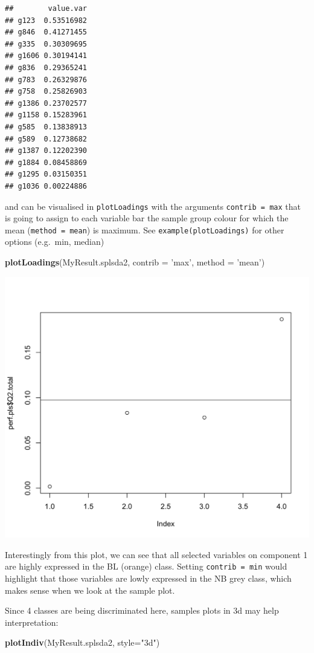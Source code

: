 \documentclass[]{book}
\newenvironment{Shaded}{\begin{snugshade}}{\end{snugshade}}
\newcommand{\KeywordTok}[1]{\textcolor[rgb]{0.13,0.29,0.53}{\textbf{#1}}}
\newcommand{\DataTypeTok}[1]{\textcolor[rgb]{0.13,0.29,0.53}{#1}}
\newcommand{\StringTok}[1]{\textcolor[rgb]{0.31,0.60,0.02}{#1}}
\newcommand{\NormalTok}[1]{#1}
\theoremstyle{definition}
\theoremstyle{definition}
\theoremstyle{definition}
\theoremstyle{remark}
\begin{document}
\begin{verbatim}
##        value.var
## g123  0.53516982
## g846  0.41271455
## g335  0.30309695
## g1606 0.30194141
## g836  0.29365241
## g783  0.26329876
## g758  0.25826903
## g1386 0.23702577
## g1158 0.15283961
## g585  0.13838913
## g589  0.12738682
## g1387 0.12202390
## g1884 0.08458869
## g1295 0.03150351
## g1036 0.00224886
\end{verbatim}

and can be visualised in \texttt{plotLoadings} with the arguments
\texttt{contrib\ =\ \textquotesingle{}max\textquotesingle{}} that is
going to assign to each variable bar the sample group colour for which
the mean (\texttt{method\ =\ \textquotesingle{}mean\textquotesingle{}})
is maximum. See \texttt{example(plotLoadings)} for other options
(e.g.~min, median)

\begin{Shaded}
\begin{Highlighting}[]
\KeywordTok{plotLoadings}\NormalTok{(MyResult.splsda2, }\DataTypeTok{contrib =} \StringTok{'max'}\NormalTok{, }\DataTypeTok{method =} \StringTok{'mean'}\NormalTok{)}
\end{Highlighting}
\end{Shaded}

\begin{center}\includegraphics[width=0.5\linewidth]{Figures/unnamed-chunk-11-1} \end{center}

Interestingly from this plot, we can see that all selected variables on
component 1 are highly expressed in the BL (orange) class. Setting
\texttt{contrib\ =\ \textquotesingle{}min\textquotesingle{}} would
highlight that those variables are lowly expressed in the NB grey class,
which makes sense when we look at the sample plot.

Since 4 classes are being discriminated here, samples plots in 3d may
help interpretation:

\begin{Shaded}
\begin{Highlighting}[]
\KeywordTok{plotIndiv}\NormalTok{(MyResult.splsda2, }\DataTypeTok{style=}\StringTok{"3d"}\NormalTok{)}
\end{Highlighting}
\end{Shaded}
\end{document}
